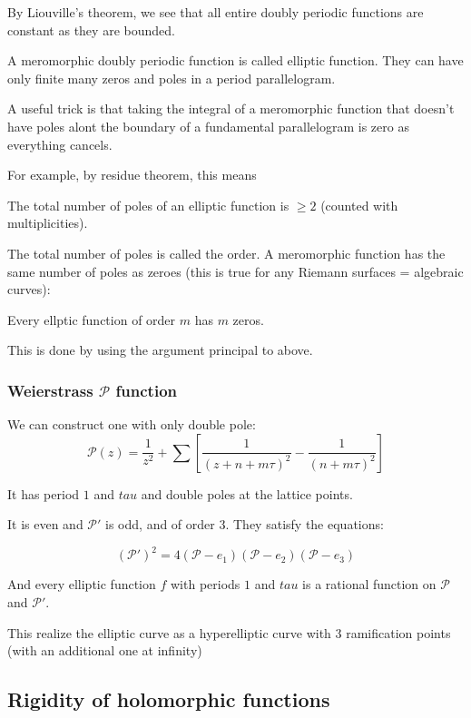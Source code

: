 \documentclass[main.tex]{subfiles}
\begin{document}
By Liouville's theorem, we see that all entire doubly periodic functions are constant as they are bounded.

A meromorphic doubly periodic function is called elliptic function. They can have only finite many zeros and poles in a period parallelogram.

A useful trick is that taking the integral of a meromorphic function that doesn't have poles alont the boundary of a fundamental parallelogram is zero as everything cancels.

For example, by residue theorem, this means 
\begin{theorem}
The total number of poles of an elliptic function is $\geq 2$ (counted with multiplicities).
\end{theorem}
The total number of poles is called the order.
A meromorphic function has the same number of poles as zeroes (this is true for any Riemann surfaces = algebraic curves):

\begin{theorem}
Every ellptic function of order $m$ has $m$ zeros.
\end{theorem}

This is done by using the argument principal to above.

\subsubsection{Weierstrass $\mathcal{P}$ function}

We can construct one with only double pole:
$$
\mathcal{P}(z) = \frac{1}{z^2} + \sum [\frac{1}{(z + n + m \tau)^2} - \frac{1}{(n + m\tau)^2}]
$$

It has period $1$ and $tau$ and double poles at the lattice points.

It is even and $\mathcal{P}'$ is odd, and of order $3$. They satisfy the equations:

\begin{theorem}
$$
(\mathcal{P}')^2 = 4(\mathcal{P} - e_1)(\mathcal{P} - e_2)(\mathcal{P} - e_3)
$$
\end{theorem}
And every elliptic function $f$ with periods $1$ and $tau$ is a rational function on $\mathcal{P}$ and $\mathcal{P'}$.

This realize the elliptic curve as a hyperelliptic curve with 3 ramification points (with an additional one at infinity)
\subsection{Rigidity of holomorphic functions}
\end{document}
